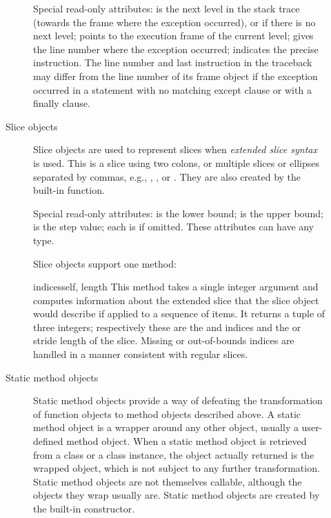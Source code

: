 \begin{description}
\begin{description}
Special read-only attributes:  is the next level in the
stack trace (towards the frame where the exception occurred), or
 if there is no next level;  points to the
execution frame of the current level;  gives the line
number where the exception occurred;  indicates the
precise instruction.  The line number and last instruction in the
traceback may differ from the line number of its frame object if the
exception occurred in a  statement with no matching
except clause or with a finally clause.

\item[Slice objects]
Slice objects are used to represent slices when \emph{extended slice
syntax} is used.  This is a slice using two colons, or multiple slices
or ellipses separated by commas, e.g., , , or .  They are also created by the built-in
 function.

Special read-only attributes:  is the lower bound;
 is the upper bound;  is the step value; each is
 if omitted. These attributes can have any type.

Slice objects support one method:

\begin{methoddesc}[slice]{indices}{self, length}
This method takes a single integer argument  and computes
information about the extended slice that the slice object would
describe if applied to a sequence of  items.  It returns a
tuple of three integers; respectively these are the  and
 indices and the  or stride length of the slice.
Missing or out-of-bounds indices are handled in a manner consistent
with regular slices.
\end{methoddesc}

\item[Static method objects]
Static method objects provide a way of defeating the transformation
of function objects to method objects described above. A static method
object is a wrapper around any other object, usually a user-defined
method object. When a static method object is retrieved from a class
or a class instance, the object actually returned is the wrapped object,
which is not subject to any further transformation. Static method
objects are not themselves callable, although the objects they
wrap usually are. Static method objects are created by the built-in
 constructor.


\end{description}
\end{description}
